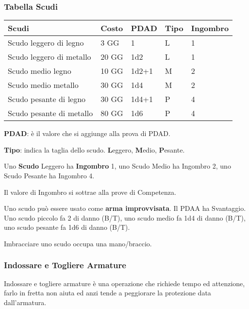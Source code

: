 \documentclass[12pt,a4paper,twoside,openany]{book}
\begin{document}
\subsubsection{Tabella Scudi}

\label{tabella-scudi}

\begin{tabular}{lllll}
\textbf{Scudi} & \textbf{Costo} & \textbf{PDAD} & \textbf{Tipo} & \textbf{Ingombro}\\
\toprule
Scudo leggero di legno 		& 3 GG   &  1		& L&1\\
Scudo leggero di metallo 	& 20 GG  &  1d2 	& L&1\\
Scudo medio legno			& 10 GG  &  1d2+1	& M&2\\
Scudo medio metallo 		& 30 GG  &  1d4  	& M&2\\
Scudo pesante di legno 		& 30 GG  &  1d4+1  	& P&4\\
Scudo pesante di metallo	& 80 GG  &  1d6  	& P&4\\
\end{tabular}

\begin{multicols}{2}

\textbf{PDAD}: è il valore che si aggiunge alla prova di PDAD.

\textbf{Tipo}: indica la taglia dello scudo. \textbf{L}eggero, \textbf{M}edio, \textbf{P}esante.

Uno \textbf{Scudo} Leggero ha \textbf{Ingombro} 1, uno Scudo Medio ha Ingombro 2, uno Scudo Pesante ha Ingombro 4.

Il valore di Ingombro si sottrae alla prove di Competenza.

Uno scudo può essere usato come \textbf{arma improvvisata}. Il PDAA ha Svantaggio. Uno scudo piccolo fa 2 di danno (B/T), uno scudo medio fa 1d4 di danno (B/T), uno scudo pesante fa 1d6 di danno (B/T).

Imbracciare uno scudo occupa una mano/braccio.

\subsubsection{Indossare e Togliere Armature}

Indossare e togliere armature è una operazione che richiede tempo ed attenzione, farlo in fretta non aiuta ed anzi tende a peggiorare la protezione data dall'armatura.

\end{multicols}
\end{document}
